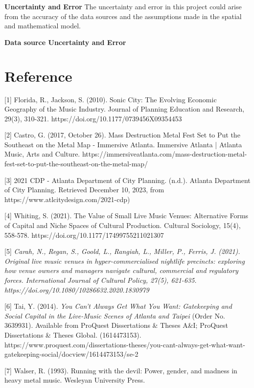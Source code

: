 \documentclass[11pt]{article}
\begin{document}
\textbf{Uncertainty and Error}
The uncertainty and error in this project could arise from the accuracy of the data sources and the assumptions made in the spatial and mathematical model.

\textbf{Data source Uncertainty and Error}







\newpage

\section{Reference}

{[}1{]} Florida, R., Jackson, S. (2010). Sonic City: The Evolving Economic Geography of the Music Industry. Journal of Planning Education and Research, 29(3), 310-321. https://doi.org/10.1177/0739456X09354453

{[}2{]} Castro, G. (2017, October 26). Mass Destruction Metal Fest Set to Put the Southeast on the Metal Map - Immersive Atlanta. Immersive Atlanta | Atlanta Music, Arts and Culture. https://immersiveatlanta.com/mass-destruction-metal-fest-set-to-put-the-southeast-on-the-metal-map/

{[}3{]} 2021 CDP - Atlanta Department of City Planning. (n.d.). Atlanta Department of City Planning. Retrieved December 10, 2023, from https://www.atlcitydesign.com/2021-cdp)

{[}4{]} Whiting, S. (2021). The Value of Small Live Music Venues: Alternative Forms of Capital and Niche Spaces of Cultural Production. Cultural Sociology, 15(4), 558-578. https://doi.org/10.1177/17499755211021307

{[}5{]} \textit{Carah, N., Regan, S., Goold, L., Rangiah, L., Miller, P., Ferris, J. (2021). Original live music venues in hyper-commercialised nightlife precincts: exploring how venue owners and managers navigate cultural, commercial and regulatory forces. International Journal of Cultural Policy, 27(5), 621-635. https://doi.org/10.1080/10286632.2020.1830979}

{[}6{]} Tai, Y. (2014). \textit{You Can't Always Get What You Want: Gatekeeping and Social Capital in the Live-Music Scenes of Atlanta and Taipei} (Order No. 3639931). Available from ProQuest Dissertations \& Theses A\&I; ProQuest Dissertations \& Theses Global. (1614473153). https://www.proquest.com/dissertations-theses/you-cant-always-get-what-want-gatekeeping-social/docview/1614473153/se-2

{[}7{]} Walser, R. (1993). Running with the devil: Power, gender, and madness in heavy metal music. Wesleyan University Press.
\end{document}
